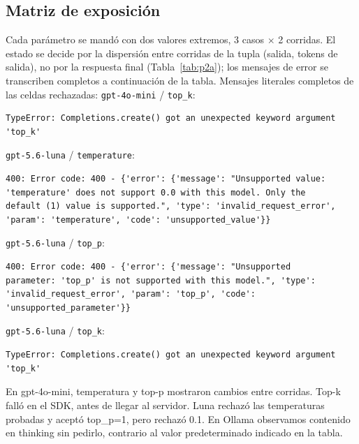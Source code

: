 \documentclass[runningheads]{llncs}
\begin{document}
\subsection{Matriz de exposición}
Cada parámetro se mandó con dos valores extremos, 3 casos $\times$ 2 corridas. El estado se decide por la dispersión entre corridas de la tupla (salida, tokens de salida), no por la respuesta final (Tabla~\ref{tab:p2a}); los mensajes de error se transcriben completos a continuación de la tabla.
Mensajes literales completos de las celdas rechazadas:
\smallskip\noindent\texttt{gpt-4o-mini} / \texttt{top\_k}:
\begin{verbatim}
TypeError: Completions.create() got an unexpected keyword argument
'top_k'
\end{verbatim}
\smallskip\noindent\texttt{gpt-5.6-luna} / \texttt{temperature}:
\begin{verbatim}
400: Error code: 400 - {'error': {'message': "Unsupported value:
'temperature' does not support 0.0 with this model. Only the
default (1) value is supported.", 'type': 'invalid_request_error',
'param': 'temperature', 'code': 'unsupported_value'}}
\end{verbatim}
\smallskip\noindent\texttt{gpt-5.6-luna} / \texttt{top\_p}:
\begin{verbatim}
400: Error code: 400 - {'error': {'message': "Unsupported
parameter: 'top_p' is not supported with this model.", 'type':
'invalid_request_error', 'param': 'top_p', 'code':
'unsupported_parameter'}}
\end{verbatim}
\smallskip\noindent\texttt{gpt-5.6-luna} / \texttt{top\_k}:
\begin{verbatim}
TypeError: Completions.create() got an unexpected keyword argument
'top_k'
\end{verbatim}
En gpt-4o-mini, temperatura y top-p mostraron cambios entre corridas. Top-k
falló en el SDK, antes de llegar al servidor. Luna rechazó las temperaturas
probadas y aceptó top\_p=1, pero rechazó 0.1. En Ollama observamos contenido en
thinking sin pedirlo, contrario al valor predeterminado indicado en la tabla.
\end{document}
